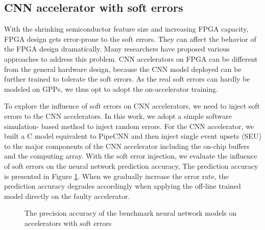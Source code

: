 \subsection{CNN accelerator with soft errors}
With the shrinking semiconductor feature size and increasing FPGA capacity, 
FPGA design gets error-prone to the soft errors. 
They can affect the behavior of the FPGA design dramatically. 
Many researchers \cite{Mansour_20,Karim_21,Nidhin_22,Subasi_23,ROSCH_24} 
have proposed various approaches to address this problem. CNN accelerators 
on FPGA can be different from the general hardware design, because 
the CNN model deployed can be further trained to tolerate the 
soft errors. As the real soft errors can hardly be modeled on GPPs, we thus
opt to adopt the on-accelerator training.

To explore the influence of soft errors on CNN accelerators, we need to inject soft errors to the CNN accelerators. 
In this work, we adopt a simple software simulation- based method to inject random errors. 
For the CNN accelerator, we built a C model equivalent to PipeCNN and then inject single event 
upsets (SEU) to the major components of the CNN accelerator including the on-chip buffers 
and the computing array. With the soft error injection, we evaluate the influence of 
soft errors on the neural network prediction accuracy, The prediction accuracy 
is presented in Figure \ref{fig:softerror accuracy}. When we gradually increase the error rate, 
the prediction accuracy degrades accordingly when applying the off-line 
trained model directly on the faulty accelerator. 

\begin{figure}
        \center
        \qquad
        \qquad
        \qquad
        \caption{The precision accuracy of the benchmark neural network models on accelerators with soft errors}
        \label{fig:softerror accuracy}
\end{figure}

